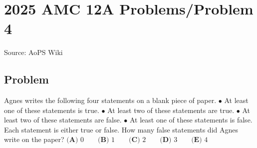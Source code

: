 \documentclass[12pt]{article}
\begin{document}
\section*{{2025 AMC 12A Problems/Problem 4}}
Source: AoPS Wiki

\subsection*{Problem}
Agnes writes the following four statements on a blank piece of paper. $\bullet$ At least one of these statements is true. $\bullet$ At least two of these statements are true. $\bullet$ At least two of these statements are false. $\bullet$ At least one of these statements is false. Each statement is either true or false. How many false statements did Agnes write on the paper? $\textbf{(A) } 0 \qquad\textbf{(B) } 1 \qquad\textbf{(C) } 2 \qquad\textbf{(D) } 3 \qquad\textbf{(E) } 4$
\end{document}
